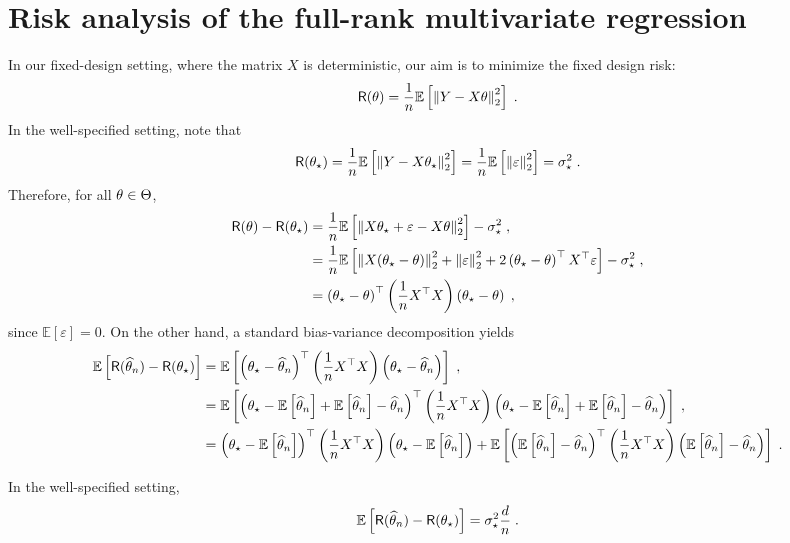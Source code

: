 \section{Risk analysis of the full-rank multivariate regression}
\label{sec:risk:fullrank}
In our fixed-design setting, where the matrix $X$ is deterministic, our aim is to minimize the fixed design risk:
$$
\mathsf{R}(\theta) = \frac{1}{n}\mathbb{E}\left[\left\|Y - X\theta\right\|_2^2\right]\;.
$$
In the well-specified setting, note that
$$
\mathsf{R}(\theta_\star) = \frac{1}{n}\mathbb{E}\left[\left\|Y - X\theta_\star\right\|_2^2\right]= \frac{1}{n}\mathbb{E}\left[\left\|\varepsilon\right\|_2^2\right] = \sigma_\star^2\;.
$$
Therefore, for all $\theta\in\Theta$,
\begin{align*}
\mathsf{R}(\theta) - \mathsf{R}(\theta_\star) &=    \frac{1}{n}\mathbb{E}\left[\left\|X\theta_\star + \varepsilon - X\theta\right\|_2^2\right] - \sigma_\star^2\;,\\
&=  \frac{1}{n}\mathbb{E}\left[\left\|X(\theta_\star-\theta)\right\|_2^2 + \left\|\varepsilon\right\|_2^2 + 2 \left(\theta_\star-\theta\right)^\top X^\top \varepsilon\right] - \sigma_\star^2\;,\\
&= \left(\theta_\star-\theta\right)^\top \left(\frac{1}{n}X^\top X\right) \left(\theta_\star-\theta\right)\;,
\end{align*}
since $\mathbb{E}[\varepsilon] = 0$. On the other hand, a standard bias-variance decomposition yields
\begin{align*}
\mathbb{E}\left[\mathsf{R}(\widehat {\theta}_n) - \mathsf{R}(\theta_\star)\right] &=  \mathbb{E}\left[ \left(\theta_\star-\widehat {\theta}_n\right)^\top \left(\frac{1}{n}X^\top X\right) \left(\theta_\star-\widehat {\theta}_n\right)\right]\;,\\
&=  \mathbb{E}\left[ \left(\theta_\star-\mathbb{E}\left[\widehat {\theta}_n\right] + \mathbb{E}\left[\widehat {\theta}_n\right] - \widehat {\theta}_n\right)^\top \left(\frac{1}{n}X^\top X\right) \left(\theta_\star-\mathbb{E}\left[\widehat {\theta}_n\right] + \mathbb{E}\left[\widehat {\theta}_n\right] - \widehat {\theta}_n\right)\right]\;,\\
&=\left(\theta_\star-\mathbb{E}\left[\widehat {\theta}_n\right]\right)^\top \left(\frac{1}{n}X^\top X\right) \left(\theta_\star-\mathbb{E}\left[\widehat {\theta}_n\right] \right) + \mathbb{E}\left[ \left(\mathbb{E}\left[\widehat {\theta}_n\right] - \widehat {\theta}_n\right)^\top \left(\frac{1}{n}X^\top X\right) \left(\mathbb{E}\left[\widehat {\theta}_n\right] - \widehat {\theta}_n\right)\right]\;.
\end{align*}


\begin{proposition}
In the well-specified setting, 
$$
\mathbb{E}\left[\mathsf{R}(\widehat {\theta}_n) - \mathsf{R}(\theta_\star)\right] = \sigma_\star^2 \frac{d}{n}\;.
$$
\end{proposition}

